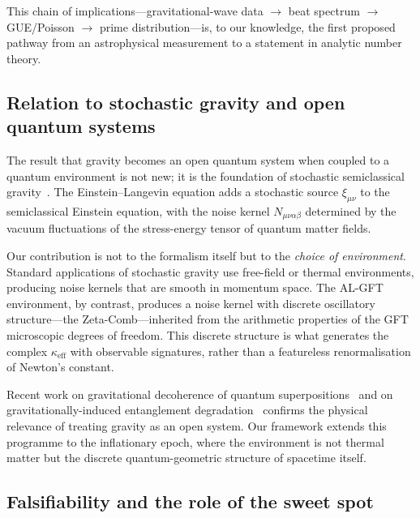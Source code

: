 \documentclass[12pt,a4paper]{article}
\begin{document}
This chain of implications---gravitational-wave data
$\to$ beat spectrum $\to$ GUE/Poisson $\to$ prime
distribution---is, to our knowledge, the first proposed
pathway from an astrophysical measurement to a statement
in analytic number theory.


\subsection{Relation to stochastic gravity and open quantum
            systems}
\label{subsec:stochastic-gravity-context}

The result that gravity becomes an open quantum system when
coupled to a quantum environment is not new; it is the
foundation of stochastic semiclassical
gravity~\cite{HuVerdaguer2004,HuVerdaguer2008,CalzettaHu2008}.
The Einstein--Langevin equation adds a stochastic source
$\xi_{\mu\nu}$ to the semiclassical Einstein equation, with
the noise kernel $N_{\mu\nu\alpha\beta}$ determined by the
vacuum fluctuations of the stress-energy tensor of quantum
matter fields.

Our contribution is not to the formalism itself but to the
\emph{choice of environment}.
Standard applications of stochastic gravity use free-field
or thermal environments, producing noise kernels that are
smooth in momentum space.
The AL-GFT environment, by contrast, produces a noise kernel
with discrete oscillatory structure---the
Zeta-Comb---inherited from the arithmetic properties of the
GFT microscopic degrees of freedom.
This discrete structure is what generates the complex
$\kappa_{\mathrm{eff}}$ with observable signatures, rather
than a featureless renormalisation of Newton's constant.

Recent work on gravitational decoherence of quantum
superpositions~\cite{Blencowe2013,Kanno2024} and on
gravitationally-induced entanglement
degradation~\cite{Anastopoulos2021} confirms the physical
relevance of treating gravity as an open system.
Our framework extends this programme to the inflationary
epoch, where the environment is not thermal matter but the
discrete quantum-geometric structure of spacetime itself.


\subsection{Falsifiability and the role of the sweet spot}
\label{subsec:falsifiability}
\end{document}
